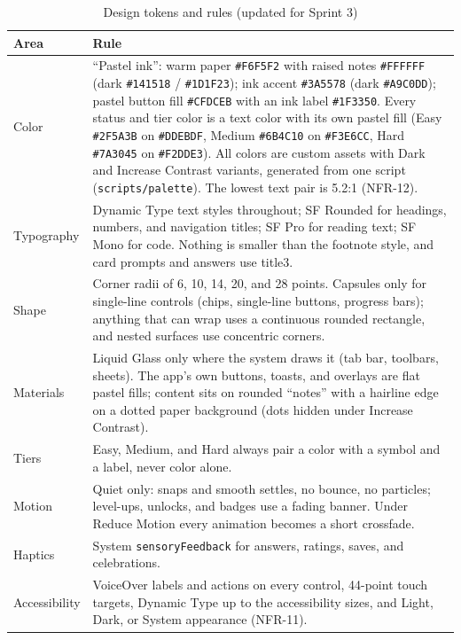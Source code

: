 \documentclass[12pt,letterpaper]{article}
\begin{document}
\begin{table}[H]
\centering
\caption{Design tokens and rules (updated for Sprint 3)}
\label{tab:tokens}
\begin{tabularx}{\textwidth}{@{}L{2.4cm} Y@{}}
\toprule
\textbf{Area} & \textbf{Rule} \\
\midrule
Color & ``Pastel ink'': warm paper \texttt{\#F6F5F2} with raised notes \texttt{\#FFFFFF} (dark \texttt{\#141518} / \texttt{\#1D1F23}); ink accent \texttt{\#3A5578} (dark \texttt{\#A9C0DD}); pastel button fill \texttt{\#CFDCEB} with an ink label \texttt{\#1F3350}. Every status and tier color is a text color with its own pastel fill (Easy \texttt{\#2F5A3B} on \texttt{\#DDEBDF}, Medium \texttt{\#6B4C10} on \texttt{\#F3E6CC}, Hard \texttt{\#7A3045} on \texttt{\#F2DDE3}). All colors are custom assets with Dark and Increase Contrast variants, generated from one script (\texttt{scripts/palette}). The lowest text pair is 5.2:1 (NFR-12). \\
Typography & Dynamic Type text styles throughout; SF Rounded for headings, numbers, and navigation titles; SF Pro for reading text; SF Mono for code. Nothing is smaller than the footnote style, and card prompts and answers use title3. \\
Shape & Corner radii of 6, 10, 14, 20, and 28 points. Capsules only for single-line controls (chips, single-line buttons, progress bars); anything that can wrap uses a continuous rounded rectangle, and nested surfaces use concentric corners. \\
Materials & Liquid Glass only where the system draws it (tab bar, toolbars, sheets). The app's own buttons, toasts, and overlays are flat pastel fills; content sits on rounded ``notes'' with a hairline edge on a dotted paper background (dots hidden under Increase Contrast). \\
Tiers & Easy, Medium, and Hard always pair a color with a symbol and a label, never color alone. \\
Motion & Quiet only: snaps and smooth settles, no bounce, no particles; level-ups, unlocks, and badges use a fading banner. Under Reduce Motion every animation becomes a short crossfade. \\
Haptics & System \texttt{sensoryFeedback} for answers, ratings, saves, and celebrations. \\
Accessibility & VoiceOver labels and actions on every control, 44-point touch targets, Dynamic Type up to the accessibility sizes, and Light, Dark, or System appearance (NFR-11). \\
\bottomrule
\end{tabularx}
\end{table}
\end{document}
